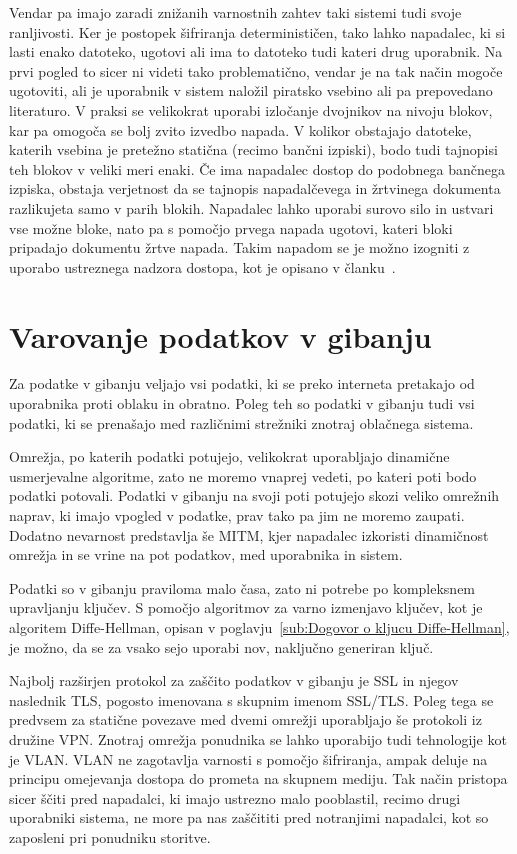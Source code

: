 \documentclass[12pt,a4paper,openany,tikz]{book}
\theoremstyle{plain}
\theoremstyle{definition}
\begin{document}
Vendar pa imajo zaradi znižanih varnostnih zahtev taki sistemi tudi svoje ranljivosti. Ker je postopek šifriranja determinističen, tako lahko napadalec, ki si lasti enako datoteko, ugotovi ali ima to datoteko tudi kateri drug uporabnik. Na prvi pogled to sicer ni videti tako problematično, vendar je na tak način mogoče ugotoviti, ali je uporabnik v sistem naložil piratsko vsebino ali pa prepovedano literaturo. V praksi se velikokrat uporabi izločanje dvojnikov na nivoju blokov, kar pa omogoča se bolj zvito izvedbo napada. V kolikor obstajajo datoteke, katerih vsebina je pretežno statična (recimo bančni izpiski), bodo tudi tajnopisi teh blokov v veliki meri enaki. Če ima napadalec dostop do podobnega bančnega izpiska, obstaja verjetnost da se tajnopis napadalčevega in žrtvinega dokumenta razlikujeta samo v parih blokih. Napadalec lahko uporabi surovo silo in ustvari vse možne bloke, nato pa s pomočjo prvega napada ugotovi, kateri bloki pripadajo dokumentu žrtve napada. Takim napadom se je možno izogniti z uporabo ustreznega nadzora dostopa, kot je opisano v članku~\cite{keelveedhi2013dupless}.

\section{Varovanje podatkov v gibanju}
\label{sec:Varovanje podatkov v gibanju}

Za podatke v gibanju veljajo vsi podatki, ki se preko interneta pretakajo od uporabnika proti oblaku in obratno. Poleg teh so podatki v gibanju tudi vsi podatki, ki se prenašajo med različnimi strežniki znotraj oblačnega sistema.

Omrežja, po katerih podatki potujejo, velikokrat uporabljajo dinamične usmerjevalne algoritme, zato ne moremo vnaprej vedeti, po kateri poti bodo podatki potovali. Podatki v gibanju na svoji poti potujejo skozi veliko omrežnih naprav, ki imajo vpogled v podatke, prav tako pa jim ne moremo zaupati. Dodatno nevarnost predstavlja še \gls{MITM}, kjer napadalec izkoristi dinamičnost omrežja in se vrine na pot podatkov, med uporabnika in sistem.

Podatki so v gibanju praviloma malo časa, zato ni potrebe po kompleksnem upravljanju ključev. S pomočjo algoritmov za varno izmenjavo ključev, kot je algoritem  Diffe-Hellman, opisan v poglavju~\ref{sub:Dogovor o kljucu Diffe-Hellman}, je možno, da se za vsako sejo uporabi nov, naključno generiran ključ.

Najbolj razširjen protokol za zaščito podatkov v gibanju je \gls{SSL} in njegov naslednik \gls{TLS}, pogosto imenovana s skupnim imenom SSL/TLS. Poleg tega se predvsem za statične povezave med dvemi omrežji uporabljajo še protokoli iz družine VPN. Znotraj omrežja ponudnika se lahko uporabijo tudi tehnologije kot je VLAN. VLAN ne zagotavlja varnosti s pomočjo šifriranja, ampak deluje na principu omejevanja dostopa do prometa na skupnem mediju. Tak način pristopa sicer ščiti pred napadalci, ki imajo ustrezno malo pooblastil, recimo drugi uporabniki sistema, ne more pa nas zaščititi pred notranjimi napadalci, kot so zaposleni pri ponudniku storitve.
\end{document}
